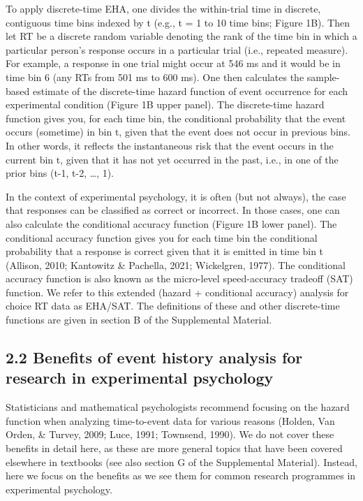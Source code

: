 \documentclass[
  man, donotrepeattitle,floatsintext]{apa6}
\begin{document}
To apply discrete-time EHA, one divides the within-trial time in discrete, contiguous time bins indexed by t (e.g., t = 1 to 10 time bins; Figure 1B).
Then let RT be a discrete random variable denoting the rank of the time bin in which a particular person's response occurs in a particular trial (i.e., repeated measure).
For example, a response in one trial might occur at 546 ms and it would be in time bin 6 (any RTs from 501 ms to 600 ms).
One then calculates the sample-based estimate of the discrete-time hazard function of event occurrence for each experimental condition (Figure 1B upper panel).
The discrete-time hazard function gives you, for each time bin, the conditional probability that the event occurs (sometime) in
bin t, given that the event does not occur in previous bins.
In other words, it reflects the instantaneous risk that the event occurs in the current bin t, given that it has not yet
occurred in the past, i.e., in one of the prior bins (t-1, t-2, \ldots, 1).

In the context of experimental psychology, it is often (but not always), the case that responses can be classified as correct or incorrect.
In those cases, one can also calculate the conditional accuracy function (Figure 1B lower panel).
The conditional accuracy function gives you for each time bin the conditional probability that a response is correct given that it is emitted in time bin t (Allison, 2010; Kantowitz \& Pachella, 2021; Wickelgren, 1977).
The conditional accuracy function is also known as the micro-level speed-accuracy tradeoff (SAT) function.
We refer to this extended (hazard + conditional accuracy) analysis for choice RT data as EHA/SAT. The definitions of these and other discrete-time functions are given in section B of the Supplemental Material.

\subsection{2.2 Benefits of event history analysis for research in experimental psychology}\label{benefits-of-event-history-analysis-for-research-in-experimental-psychology}

Statisticians and mathematical psychologists recommend focusing on the hazard function when analyzing time-to-event data for various reasons (Holden, Van Orden, \& Turvey, 2009; Luce, 1991; Townsend, 1990).
We do not cover these benefits in detail here, as these are more general topics that have been covered elsewhere in textbooks (see also section G of the Supplemental Material).
Instead, here we focus on the benefits as we see them for common research programmes in experimental psychology.
\end{document}
